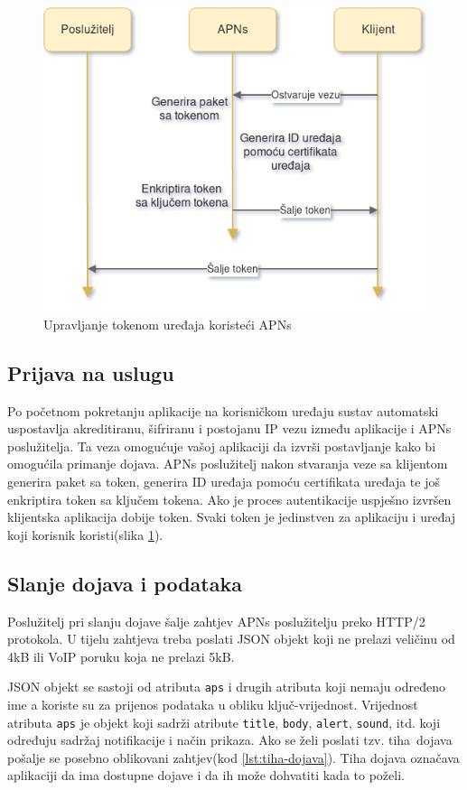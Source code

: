 \documentclass[times, utf8, zavrsni]{fer}
\begin{document}
\begin{figure}[htb]
\centering
\includegraphics[width=14cm]{img/apns.png}
\caption{Upravljanje tokenom uređaja koristeći APNs}
\label{fig:apns-image}
\end{figure}

\subsection{Prijava na uslugu}

Po početnom pokretanju aplikacije na korisničkom uređaju sustav automatski uspostavlja akreditiranu, šifriranu i postojanu IP vezu između aplikacije i APNs poslužitelja. Ta veza omogućuje vašoj aplikaciji da izvrši postavljanje kako bi omogućila primanje dojava. APNs poslužitelj nakon stvaranja veze sa klijentom generira paket sa token, generira ID uređaja pomoću certifikata uređaja te još enkriptira token sa ključem tokena. Ako je proces autentikacije uspješno izvršen klijentska aplikacija dobije token. Svaki token je jedinstven za aplikaciju i uređaj koji korisnik koristi(slika \ref{fig:apns-image}).
\subsection{Slanje dojava i podataka}

Poslužitelj pri slanju dojave šalje zahtjev APNs poslužitelju preko HTTP/2 protokola. U tijelu zahtjeva treba poslati JSON objekt koji ne prelazi veličinu od 4kB ili 	VoIP poruku koja ne prelazi 5kB.

JSON objekt se sastoji od atributa {\tt aps} i drugih atributa koji nemaju određeno ime a koriste su za prijenos podataka u obliku ključ-vrijednost. Vrijednost atributa {\tt aps} je objekt koji sadrži atribute {\tt title}, {\tt body}, {\tt alert}, {\tt sound}, itd. koji određuju sadržaj notifikacije i način prikaza. Ako se želi poslati tzv. \glqq tiha\grqq\  dojava pošalje se posebno oblikovani zahtjev(kod \ref{lst:tiha-dojava}). Tiha dojava označava aplikaciji da ima dostupne dojave i da ih može dohvatiti kada to poželi.\citep{apns2017}
\end{document}
